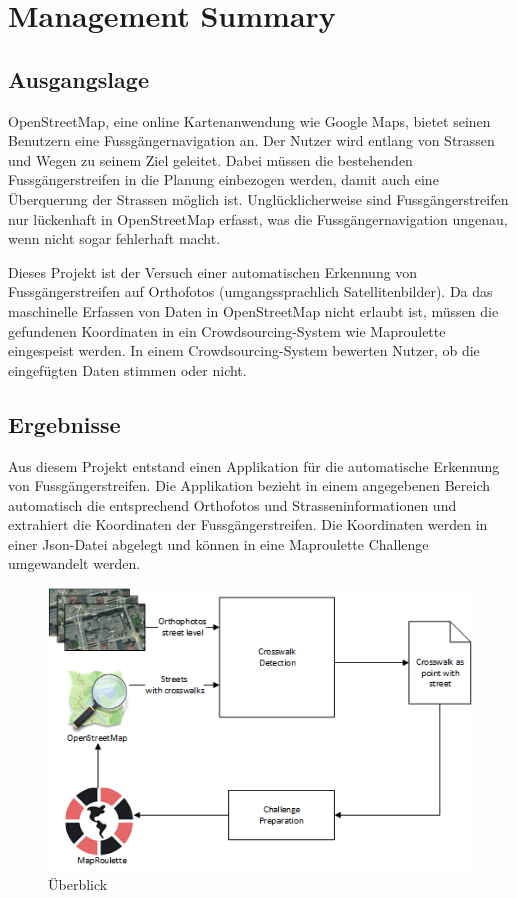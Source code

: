\section{Management Summary}
\subsection*{Ausgangslage}
OpenStreetMap, eine online Kartenanwendung wie Google Maps, bietet seinen Benutzern eine Fussgängernavigation an. Der Nutzer wird entlang von Strassen und Wegen zu seinem Ziel geleitet. Dabei müssen die bestehenden Fussgängerstreifen in die Planung einbezogen werden, damit auch eine Überquerung der Strassen möglich ist. Unglücklicherweise sind Fussgängerstreifen nur lückenhaft in OpenStreetMap erfasst, was die Fussgängernavigation ungenau, wenn nicht sogar fehlerhaft macht.

Dieses Projekt ist der Versuch einer automatischen Erkennung von Fussgängerstreifen auf Orthofotos (umgangssprachlich Satellitenbilder). Da das maschinelle Erfassen von Daten in OpenStreetMap nicht erlaubt ist, müssen die gefundenen Koordinaten in ein Crowdsourcing-System wie Maproulette eingespeist werden. In einem Crowdsourcing-System bewerten Nutzer, ob die eingefügten Daten stimmen oder nicht.

\subsection*{Ergebnisse}
Aus diesem Projekt entstand einen Applikation für die automatische Erkennung von Fussgängerstreifen. Die Applikation bezieht in einem angegebenen Bereich automatisch die entsprechend Orthofotos und Strasseninformationen und extrahiert die Koordinaten der Fussgängerstreifen. Die Koordinaten werden in einer Json-Datei abgelegt und können in eine Maproulette Challenge umgewandelt werden. 
\\
\begin{figure}[H]
	\centering
	\includegraphics[]{images/management_summary_1.png}
	\caption[Management Summery Überblick]{Überblick}
\end{figure}


